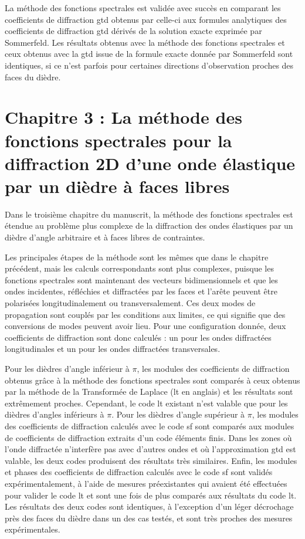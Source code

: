 La méthode des fonctions spectrales est validée avec succès en comparant les coefficients de diffraction \acrshort{gtd} obtenus par celle-ci aux formules analytiques des coefficients de diffraction \acrshort{gtd} dérivés de la solution exacte exprimée par Sommerfeld. Les résultats obtenus avec la méthode des fonctions spectrales et ceux obtenus avec la \acrshort{gtd} issue de la formule exacte donnée par Sommerfeld sont identiques, si ce n'est parfois pour certaines directions d'observation proches des faces du dièdre.

\section[Résumé du chapitre 3]{Chapitre 3 : La méthode des fonctions spectrales pour la diffraction 2D d'une onde élastique par un dièdre à faces libres}

\hspace{2em}Dans le troisième chapitre du manuscrit, la méthode des fonctions spectrales est étendue au problème plus complexe de la diffraction des ondes élastiques par un dièdre d'angle arbitraire et à faces libres de contraintes.

Les principales étapes de la méthode sont les mêmes que dans le chapitre précédent, mais les calculs correspondants sont plus complexes, puisque les fonctions spectrales sont maintenant des vecteurs bidimensionnels et que les ondes incidentes, réfléchies et diffractées par les faces et l'arête peuvent être polarisées longitudinalement ou transversalement. Ces deux modes de propagation sont couplés par les conditions aux limites, ce qui signifie que des conversions de modes peuvent avoir lieu. Pour une configuration donnée, deux coefficients de diffraction sont donc calculés : un pour les ondes diffractées longitudinales et un pour les ondes diffractées transversales.

Pour les dièdres d'angle inférieur à $\pi$, les modules des coefficients de diffraction obtenus grâce à la méthode des fonctions spectrales sont comparés à ceux obtenus par la méthode de la Transformée de Laplace (\acrshort{lt} en anglais) et les résultats sont extrêmement proches. Cependant, le code \acrshort{lt} existant n'est valable que pour les dièdres d'angles inférieurs à $\pi$. Pour les dièdres d'angle supérieur à $\pi$, les modules des coefficients de diffraction calculés avec le code \acrshort{sf} sont comparés aux modules de coefficients de diffraction extraits d'un code éléments finis. Dans les zones où l'onde diffractée n'interfère pas avec d'autres ondes et où l'approximation \acrshort{gtd} est valable, les deux codes produisent des résultats très similaires. Enfin, les modules et phases des coefficients de diffraction calculés avec le code \acrshort{sf} sont validés expérimentalement, à l'aide de mesures préexistantes qui avaient été effectuées pour valider le code \acrshort{lt} et sont une fois de plus comparés aux résultats du code \acrshort{lt}. Les résultats des deux codes sont identiques, à l'exception d'un léger décrochage près des faces du dièdre dans un des cas testés, et sont très proches des mesures expérimentales.

